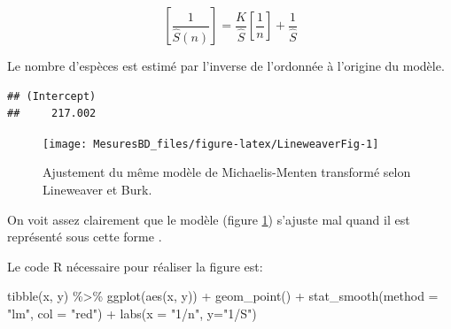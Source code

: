\documentclass[
  11pt,
  american,
  a4paper,
  extrafontsizes,onecolumn,openright
  ]{memoir}
\newenvironment{Shaded}{\begin{snugshade}}{\end{snugshade}}
\newcommand{\AttributeTok}[1]{\textcolor[rgb]{0.77,0.63,0.00}{#1}}
\newcommand{\DecValTok}[1]{\textcolor[rgb]{0.00,0.00,0.81}{#1}}
\newcommand{\FunctionTok}[1]{\textcolor[rgb]{0.00,0.00,0.00}{#1}}
\newcommand{\NormalTok}[1]{#1}
\newcommand{\OtherTok}[1]{\textcolor[rgb]{0.56,0.35,0.01}{#1}}
\newcommand{\SpecialCharTok}[1]{\textcolor[rgb]{0.00,0.00,0.00}{#1}}
\newcommand{\StringTok}[1]{\textcolor[rgb]{0.31,0.60,0.02}{#1}}
\begin{document}
\begin{equation}
  \label{eq:Lineweaver1934}
  \left [\frac{1}{\hat{S}(n)} \right] 
  = \frac{K}{\hat{S}} \left[ \frac{1}{n} \right] + \frac{1}{\hat{S}} 
\end{equation}

Le nombre d'espèces est estimé par l'inverse de l'ordonnée à l'origine du modèle.

\scriptsize

\begin{Shaded}
\end{Shaded}

\begin{verbatim}
## (Intercept) 
##     217.002
\end{verbatim}

\normalsize



\scriptsize

\begin{figure}

{\centering \texttt{[image: MesuresBD\_files/figure-latex/LineweaverFig-1]} 

}

\caption{Ajustement du même modèle de Michaelis-Menten transformé selon Lineweaver et Burk.}\label{fig:LineweaverFig}
\end{figure}

\normalsize

On voit assez clairement que le modèle (figure \ref{fig:LineweaverFig}) s'ajuste mal quand il est représenté sous cette forme \autocite{Raaijmakers1987}.

Le code R nécessaire pour réaliser la figure est:

\scriptsize

\begin{Shaded}
\begin{Highlighting}[]
\FunctionTok{tibble}\NormalTok{(x, y) }\SpecialCharTok{\%\textgreater{}\%} 
  \FunctionTok{ggplot}\NormalTok{(}\FunctionTok{aes}\NormalTok{(x, y)) }\SpecialCharTok{+} 
    \FunctionTok{geom\_point}\NormalTok{() }\SpecialCharTok{+}
    \FunctionTok{stat\_smooth}\NormalTok{(}\AttributeTok{method =} \StringTok{"lm"}\NormalTok{, }\AttributeTok{col =} \StringTok{"red"}\NormalTok{) }\SpecialCharTok{+}
    \FunctionTok{labs}\NormalTok{(}\AttributeTok{x =} \StringTok{"1/n"}\NormalTok{, }\AttributeTok{y=}\StringTok{"1/S"}\NormalTok{)}
\end{Highlighting}
\end{Shaded}
\end{document}
